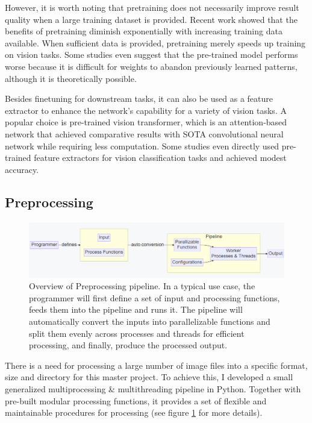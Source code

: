 However, it is worth noting that pretraining does not necessarily improve result quality when a large training dataset is provided. Recent work showed that the benefits of pretraining diminish exponentially with increasing training data available. When sufficient data is provided, pretraining merely speeds up training on vision tasks\cite{heRethinkingImageNetPretraining2018}. Some studies even suggest that the pre-trained model performs worse because it is difficult for weights to abandon previously learned patterns, although it is theoretically possible\cite{el-noubyAreLargescaleDatasets2021}. 

Besides finetuning for downstream tasks, it can also be used as a feature extractor to enhance the network's capability for a variety of vision tasks. A popular choice is pre-trained vision transformer\cite{dosovitskiyImageWorth16x162021}, which is an attention-based network that achieved comparative results with SOTA convolutional neural network while requiring less computation. Some studies even directly used pre-trained feature extractors for vision classification tasks and achieved modest accuracy\cite{awaisCanPretrainedConvolutional2020}.


\subsection{Preprocessing}

\begin{figure}
    \centering
    \includegraphics[width=1.0\textwidth]{images/introduction/preprocess_pipeline.png}
    \caption[Overview of Preprocessing pipeline.]{Overview of Preprocessing pipeline. In a typical use case, the programmer will first define a set of input and processing functions, feeds them into the pipeline and runs it. The pipeline will automatically convert the inputs into parallelizable functions and split them evenly across processes and threads for efficient processing, and finally, produce the processed output.} 
    \label{fig:preprocess_pipeline}
\end{figure}

There is a need for processing a large number of image files into a specific format, size and directory for this master project. To achieve this, I developed a small generalized multiprocessing \& multithreading pipeline in Python\cite{WelcomePythonOrg}. Together with pre-built modular processing functions, it provides a set of flexible and maintainable procedures for processing (see figure \ref{fig:preprocess_pipeline} for more details).

